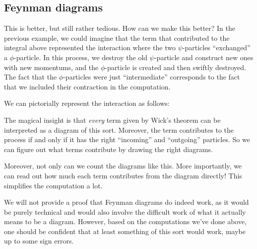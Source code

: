 \documentclass[a4paper]{article}
\begin{document}
\subsection{Feynman diagrams}
This is better, but still rather tedious. How can we make this better? In the previous example, we could imagine that the term that contributed to the integral above represented the interaction where the two $\psi$-particles ``exchanged'' a $\phi$-particle. In this process, we destroy the old $\psi$-particle and construct new ones with new momentums, and the $\phi$-particle is created and then swiftly destroyed. The fact that the $\phi$-particles were just ``intermediate'' corresponds to the fact that we included their contraction in the computation.

We can pictorially represent the interaction as follows:
\begin{center}
\end{center}
The magical insight is that \emph{every} term given by Wick's theorem can be interpreted as a diagram of this sort. Moreover, the term contributes to the process if and only if it has the right ``incoming'' and ``outgoing'' particles. So we can figure out what terms contribute by drawing the right diagrams.

Moreover, not only can we count the diagrams like this. More importantly, we can read out how much each term contributes from the diagram directly! This simplifies the computation a lot.

We will not provide a proof that Feynman diagrams do indeed work, as it would be purely technical and would also involve the difficult work of what it actually means to be a diagram. However, based on the computations we've done above, one should be confident that at least something of this sort would work, maybe up to some sign errors.
\end{document}
